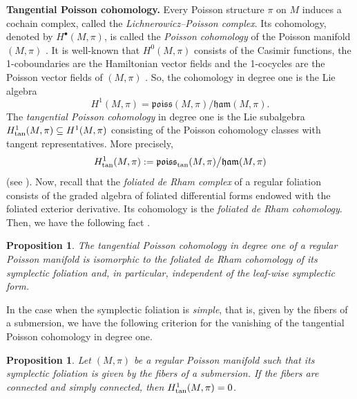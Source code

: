\documentclass[pdftex]{sigma}%
\numberwithin{equation}{section}
\newtheorem{Proposition}[Theorem]{Proposition}
 { \theoremstyle{definition}
\newtheorem{Definition}[Theorem]{Definition}
\newtheorem{Note}[Theorem]{Note}
\newtheorem{Example}[Theorem]{Example}
\newtheorem{Remark}[Theorem]{Remark} }
\begin{document}
{\bf Tangential Poisson cohomology.} Every Poisson structure $\pi$ on $M$ induces a cochain complex, called the \emph{Lichnerowicz--Poisson complex}. Its cohomology, denoted by $H^{\bullet}(M,\pi)$, is called the \emph{Poisson cohomology} of the Poisson manifold $(M,\pi)$ \cite{Lichnerowicz}. It is well-known that $H^{0}(M,\pi)$ consists of the Casimir functions, the 1-coboundaries are the Hamiltonian vector fields and the 1-cocycles are the Poisson vector fields of $(M,\pi)$ \cite{DZ,Lichnerowicz,Va-94,VK-88,VK-90}. So, the cohomology in degree one is the Lie algebra
 \begin{equation*}
 H^{1}(M,\pi) = {\mathfrak{poiss}(M,\pi)} \big/ {\mathfrak{ham}(M,\pi)}.
 \end{equation*}
The \emph{tangential Poisson cohomology} in degree one is the Lie subalgebra $H^{1}_{{\rm tan}}(M,\pi) \subseteq H^{1}(M,\pi)$ consisting of the Poisson cohomology classes with tangent representatives. More precisely,
 \begin{equation*}
 H^{1}_{{\rm tan}}(M,\pi) := {\mathfrak{poiss}_{{\rm tan}}(M,\pi)} \big/ {\mathfrak{ham}(M,\pi)}
 \end{equation*}
(see \cite[Definition~2]{AG}). Now, recall that the \emph{foliated de Rham complex} of a regular foliation consists of the graded algebra of foliated differential forms endowed with the foliated exterior derivative. Its cohomology is the \emph{foliated de Rham cohomology}.
Then, we have the following fact \cite[Chapter~5]{Va-94}.

\begin{Proposition}\label{prop:PoissTan}
The tangential Poisson cohomology in degree one of a regular Poisson manifold is isomorphic to the foliated de Rham cohomology of its symplectic foliation and, in particular, independent of the leaf-wise symplectic form.
\end{Proposition}

In the case when the symplectic foliation is \emph{simple}, that is, given by the fibers of a submersion, we have the following criterion for the vanishing of the tangential Poisson cohomology in degree one.

\begin{Proposition}\label{prop:H1triv}
Let $(M,\pi)$ be a regular Poisson manifold such that its symplectic foliation is given by the fibers of a submersion. If the fibers are connected and simply connected, then $H^{1}_{{\rm tan}}(M,\pi)=0$.
\end{Proposition}
\end{document}
